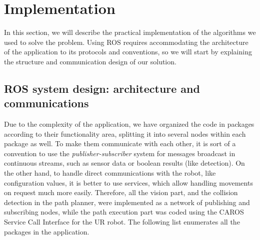 
\section{Implementation}
\label{sec:ros}

In this section, we will describe the practical implementation of the algorithms we used to solve the problem. Using ROS requires accommodating the architecture of the application to its protocols and conventions, so we will start by explaining the structure and communication design of our solution. 

\subsection{ROS system design: architecture and communications}

Due to the complexity of the application, we have organized the code in packages according to their functionality area, splitting it into several nodes within each package as well. To make them communicate with each other, it is sort of a convention to use the \textit{publisher-subscriber} system for messages broadcast in continuous streams, such as sensor data or boolean results (like detection). On the other hand, to handle direct communications with the robot, like configuration values, it is better to use services, which allow handling movements on request much more easily. Therefore, all the vision part, and the collision detection in the path planner, were implemented as a network of publishing and subscribing nodes, while the path execution part was coded using the CAROS Service Call Interface for the UR robot. The following list enumerates all the packages in the application.

